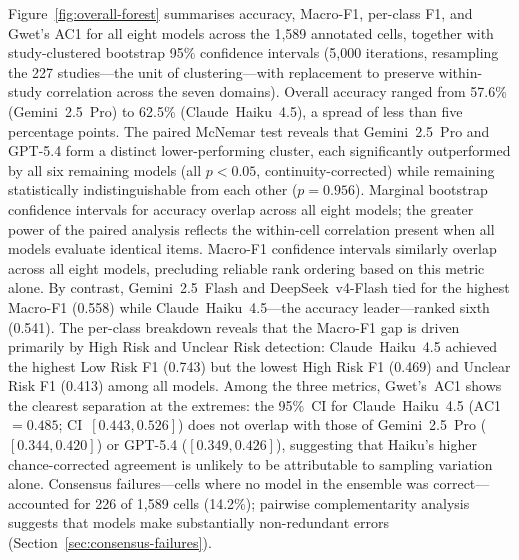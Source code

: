 \documentclass[../main.tex]{subfiles}
\begin{document}
Figure~\ref{fig:overall-forest} summarises accuracy, Macro-F1, per-class F1, and Gwet's AC1
for all eight models across the 1{,}589 annotated cells, together with
study-clustered bootstrap 95\% confidence intervals (5{,}000 iterations,
resampling the 227 studies---the unit of clustering---with replacement to
preserve within-study correlation across the seven domains).
Overall accuracy ranged from 57.6\% (Gemini~2.5~Pro) to 62.5\%
(Claude~Haiku~4.5), a spread of less than five percentage points.
The paired McNemar test reveals that Gemini~2.5~Pro and GPT-5.4 form a
distinct lower-performing cluster, each significantly outperformed by all six
remaining models (all $p < 0.05$, continuity-corrected) while remaining
statistically indistinguishable from each other ($p = 0.956$).
Marginal bootstrap confidence intervals for accuracy overlap across all eight
models; the greater power of the paired analysis reflects the within-cell
correlation present when all models evaluate identical items.
Macro-F1 confidence intervals similarly overlap across all eight models,
precluding reliable rank ordering based on this metric alone.
By contrast, Gemini~2.5~Flash and
DeepSeek~v4-Flash tied for the highest Macro-F1 (0.558) while
Claude~Haiku~4.5---the accuracy leader---ranked sixth (0.541).
The per-class breakdown reveals that the Macro-F1 gap is driven primarily by
High Risk and Unclear Risk detection: Claude~Haiku~4.5 achieved the highest
Low Risk F1 (0.743) but the lowest High Risk F1 (0.469) and Unclear Risk F1
(0.413) among all models.
Among the three metrics, Gwet's~AC1 shows the clearest separation at the
extremes: the 95\%~CI for Claude~Haiku~4.5 (AC1~$= 0.485$; CI~$[0.443, 0.526]$)
does not overlap with those of Gemini~2.5~Pro ($[0.344, 0.420]$) or
GPT-5.4 ($[0.349, 0.426]$), suggesting that Haiku's higher chance-corrected
agreement is unlikely to be attributable to sampling variation alone.
Consensus failures---cells where no model in the ensemble was correct---accounted
for 226 of 1{,}589 cells (14.2\%); pairwise complementarity analysis suggests
that models make substantially non-redundant errors
(Section~\ref{sec:consensus-failures}).
\end{document}
